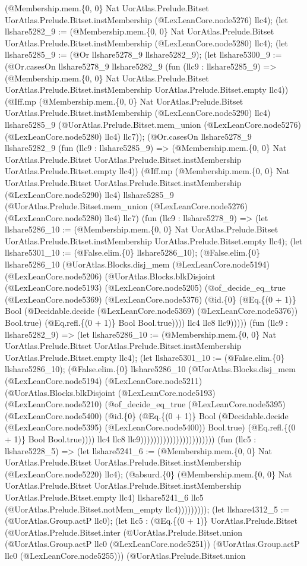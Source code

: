 \documentclass[11pt]{article}
\begin{document}
(@Membership.mem.\{0, 0\} Nat UorAtlas.Prelude.Bitset UorAtlas.Prelude.Bitset.instMembership (@LexLeanCore.node5276) llc4); (let llshare5282\_9 := (@Membership.mem.\{0, 0\} Nat UorAtlas.Prelude.Bitset UorAtlas.Prelude.Bitset.instMembership (@LexLeanCore.node5280) llc4); (let llshare5285\_9 := (@Or llshare5278\_9 llshare5282\_9); (let llshare5300\_9 := (@Or.casesOn llshare5278\_9 llshare5282\_9 (fun (llc9 : llshare5285\_9) => (@Membership.mem.\{0, 0\} Nat UorAtlas.Prelude.Bitset UorAtlas.Prelude.Bitset.instMembership UorAtlas.Prelude.Bitset.empty llc4)) (@Iff.mp (@Membership.mem.\{0, 0\} Nat UorAtlas.Prelude.Bitset UorAtlas.Prelude.Bitset.instMembership (@LexLeanCore.node5290) llc4) llshare5285\_9 (@UorAtlas.Prelude.Bitset.mem\_union (@LexLeanCore.node5276) (@LexLeanCore.node5280) llc4) llc7)); (@Or.casesOn llshare5278\_9 llshare5282\_9 (fun (llc9 : llshare5285\_9) => (@Membership.mem.\{0, 0\} Nat UorAtlas.Prelude.Bitset UorAtlas.Prelude.Bitset.instMembership UorAtlas.Prelude.Bitset.empty llc4)) (@Iff.mp (@Membership.mem.\{0, 0\} Nat UorAtlas.Prelude.Bitset UorAtlas.Prelude.Bitset.instMembership (@LexLeanCore.node5290) llc4) llshare5285\_9 (@UorAtlas.Prelude.Bitset.mem\_union (@LexLeanCore.node5276) (@LexLeanCore.node5280) llc4) llc7) (fun (llc9 : llshare5278\_9) => (let llshare5286\_10 := (@Membership.mem.\{0, 0\} Nat UorAtlas.Prelude.Bitset UorAtlas.Prelude.Bitset.instMembership UorAtlas.Prelude.Bitset.empty llc4); (let llshare5301\_10 := (@False.elim.\{0\} llshare5286\_10); (@False.elim.\{0\} llshare5286\_10 (@UorAtlas.Blocks.disj\_mem (@LexLeanCore.node5194) (@LexLeanCore.node5206) (@UorAtlas.Blocks.blkDisjoint (@LexLeanCore.node5193) (@LexLeanCore.node5205) (@of\_decide\_eq\_true (@LexLeanCore.node5369) (@LexLeanCore.node5376) (@id.\{0\} (@Eq.\{(0 + 1)\} Bool (@Decidable.decide (@LexLeanCore.node5369) (@LexLeanCore.node5376)) Bool.true) (@Eq.refl.\{(0 + 1)\} Bool Bool.true)))) llc4 llc8 llc9))))) (fun (llc9 : llshare5282\_9) => (let llshare5286\_10 := (@Membership.mem.\{0, 0\} Nat UorAtlas.Prelude.Bitset UorAtlas.Prelude.Bitset.instMembership UorAtlas.Prelude.Bitset.empty llc4); (let llshare5301\_10 := (@False.elim.\{0\} llshare5286\_10); (@False.elim.\{0\} llshare5286\_10 (@UorAtlas.Blocks.disj\_mem (@LexLeanCore.node5194) (@LexLeanCore.node5211) (@UorAtlas.Blocks.blkDisjoint (@LexLeanCore.node5193) (@LexLeanCore.node5210) (@of\_decide\_eq\_true (@LexLeanCore.node5395) (@LexLeanCore.node5400) (@id.\{0\} (@Eq.\{(0 + 1)\} Bool (@Decidable.decide (@LexLeanCore.node5395) (@LexLeanCore.node5400)) Bool.true) (@Eq.refl.\{(0 + 1)\} Bool Bool.true)))) llc4 llc8 llc9))))))))))))))))))))))) (fun (llc5 : llshare5228\_5) => (let llshare5241\_6 := (@Membership.mem.\{0, 0\} Nat UorAtlas.Prelude.Bitset UorAtlas.Prelude.Bitset.instMembership (@LexLeanCore.node5220) llc4); (@absurd.\{0\} (@Membership.mem.\{0, 0\} Nat UorAtlas.Prelude.Bitset UorAtlas.Prelude.Bitset.instMembership UorAtlas.Prelude.Bitset.empty llc4) llshare5241\_6 llc5 (@UorAtlas.Prelude.Bitset.notMem\_empty llc4))))))))); (let llshare4312\_5 := (@UorAtlas.Group.actP llc0); (let llc5 : (@Eq.\{(0 + 1)\} UorAtlas.Prelude.Bitset (@UorAtlas.Prelude.Bitset.inter (@UorAtlas.Prelude.Bitset.union (@UorAtlas.Group.actP llc0 (@LexLeanCore.node5251)) (@UorAtlas.Group.actP llc0 (@LexLeanCore.node5255))) (@UorAtlas.Prelude.Bitset.union 
\end{document}
